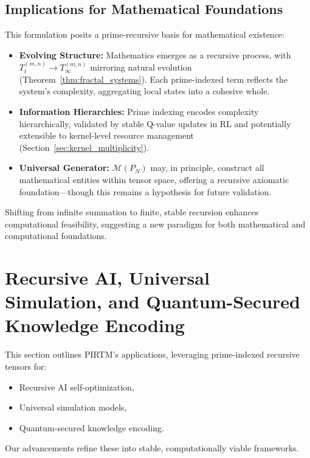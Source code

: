 \documentclass{article}
\theoremstyle{plain}
\begin{document}
\subsection{Implications for Mathematical Foundations}
This formulation posits a prime-recursive basis for mathematical existence:
\begin{itemize}
    \item \textbf{Evolving Structure:} Mathematics emerges as a recursive process, with \(T_t^{(m,n)} \to T_\infty^{(m,n)}\) mirroring natural evolution (Theorem~\ref{thm:fractal_systems}). Each prime-indexed term reflects the system’s complexity, aggregating local states into a cohesive whole.
    \item \textbf{Information Hierarchies:} Prime indexing encodes complexity hierarchically, validated by stable Q-value updates in RL and potentially extensible to kernel-level resource management (Section~\ref{sec:kernel_multiplicity}).
    \item \textbf{Universal Generator:} \(\mathcal{M}(P_N)\) may, in principle, construct all mathematical entities within tensor space, offering a recursive axiomatic foundation—though this remains a hypothesis for future validation.
\end{itemize}
Shifting from infinite summation to finite, stable recursion enhances computational feasibility, suggesting a new paradigm for both mathematical and computational foundations.

\section{Recursive AI, Universal Simulation, and Quantum-Secured Knowledge Encoding}
This section outlines PIRTM’s applications, leveraging prime-indexed recursive tensors for:
\begin{itemize}
    \item Recursive AI self-optimization,
    \item Universal simulation models,
    \item Quantum-secured knowledge encoding.
\end{itemize}
Our advancements refine these into stable, computationally viable frameworks.
\end{document}
